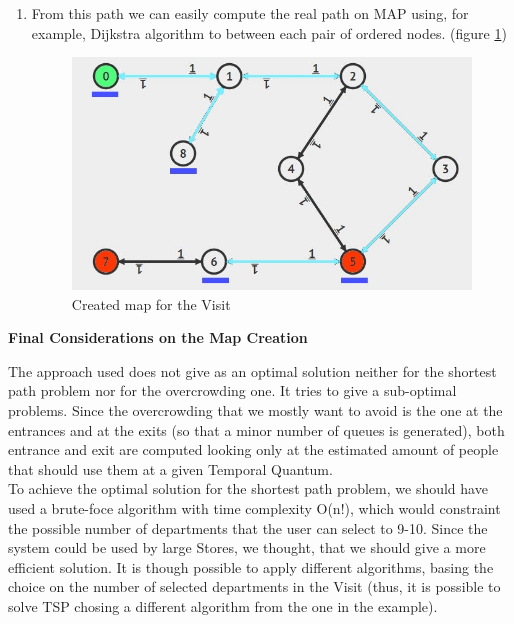 \documentclass[a4paper, 12pt, oneside, table]{article}
\begin{document}
\begin{enumerate}
    \item From this path we can easily compute the real path on MAP using, for example, Dijkstra algorithm to between each pair of ordered nodes. (figure \ref{afterDij})
    \begin{figure}[H]
    \centering
        \centering
        \includegraphics[height=0.4\textheight, scale=0.2, keepaspectratio]{img/alg_map_man/store_graph_PATH.JPG}
        \caption{Created map for the Visit}
        \label{afterDij}
    \end{figure}
\end{enumerate}

\vspace{0.4em}
\textbf{Final Considerations on the Map Creation} \newline
\vspace{0.4em}

The approach used does not give as an optimal solution neither for the shortest path problem nor for the overcrowding one. It tries to give a sub-optimal problems. Since the overcrowding that we mostly want to avoid is the one at the entrances and at the exits (so that a minor number of queues is generated), both entrance and exit are computed looking only at the estimated amount of people that should use them at a given Temporal Quantum. \newline
\\
To achieve the optimal solution for the shortest path problem, we should have used a brute-foce algorithm with time complexity O(n!), which would constraint the possible number of departments that the user can select to 9-10. Since the system could be used by large Stores, we thought, that we should give a more efficient solution. It is though possible to apply different algorithms, basing the choice on the number of selected departments in the Visit (thus, it is possible to solve TSP chosing a different algorithm from the one in the example).
\end{document}
